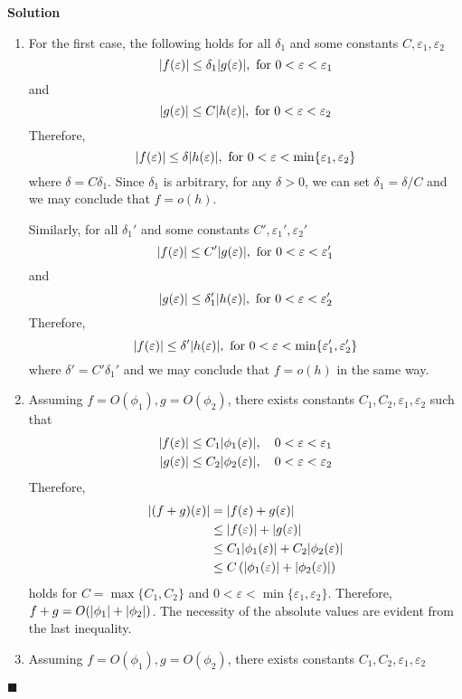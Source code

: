 \documentclass[11pt]{article}
\newcommand{\vep}{\varepsilon}
\DeclarePairedDelimiter\abs{\lvert}{\rvert}
\theoremstyle{problemstyle}
\newenvironment{solution}
  {\noindent\textbf{Solution}\quad}
  {\hfill$\blacksquare$\par\vspace{1em}}
\begin{document}
\begin{solution}
  \begin{enumerate}
    \item For the first case, the following holds for all $\delta_1$ and some constants $C,
      \vep_1, \vep_2$
      \[ \abs{f(\vep)} \leq \delta_1 \abs{g(\vep)},  \text{ for } 0 < \vep < \vep_1 \]
      and
      \[ \abs{g(\vep)} \leq C \abs{h(\vep)}, \text{ for } 0 < \vep < \vep_2 \]
      Therefore,
      \[ \abs{f(\vep)} \leq \delta \abs{h(\vep)}, \text{ for } 0 < \vep <
      \min\{\vep_1, \vep_2\} \]
      where $\delta = C \delta_1$. Since $\delta_1$ is arbitrary, for any $\delta > 0$, we can set
      $\delta_1 = \delta / C$ and we may conclude that $f = o(h)$.

      Similarly, for all $\delta_1'$ and some constants $C', \vep_1', \vep_2'$ 
      \[ \abs{f(\vep)} \leq C' \abs{g(\vep)},  \text{ for } 0 < \vep < \vep_1' \]
      and
      \[ \abs{g(\vep)} \leq \delta_1' \abs{h(\vep)}, \text{ for } 0 < \vep < \vep_2' \]
      Therefore,
      \[ \abs{f(\vep)} \leq \delta' \abs{h(\vep)}, \text{ for } 0 < \vep <
      \min\{\vep_1', \vep_2'\} \]
      where $\delta' = C' \delta_1'$ and we may conclude that $f = o(h)$ in the same way. 
    \item Assuming $f = O(\phi_1), g = O(\phi_2)$, there exists constants $C_1,C_2,\vep_1,\vep_2$
      such that
      \begin{align*}
        \abs{f(\vep)} & \leq C_1 \abs{\phi_1(\vep)}, \quad 0 < \vep < \vep_1 \\
        \abs{g(\vep)} & \leq C_2 \abs{\phi_2(\vep)}, \quad 0 < \vep < \vep_2
      \end{align*}
      Therefore,
      \begin{align*}
        \abs{(f + g)(\vep)} 
          & = \abs{f(\vep) + g(\vep)} \\
          & \leq \abs{f(\vep)} + \abs{g(\vep)} \\
          & \leq C_1 \abs{\phi_1(\vep)} + C_2 \abs{\phi_2(\vep)} \\
          & \leq C \left( \abs{\phi_1(\vep)} + \abs{\phi_2(\vep)} \right) \\
      \end{align*}
      holds for $C = \max\{C_1, C_2\}$ and $0 < \vep < \min\{\vep_1, \vep_2\}$.
      Therefore, $f + g = O(\abs{\phi_1} + \abs{\phi_2})$. The necessity of the absolute
      values are evident from the last inequality.
    \item Assuming $f = O(\phi_1), g = O(\phi_2)$, there exists constants $C_1,C_2,\vep_1,\vep_2$

\end{enumerate}
\end{solution}
\end{document}
